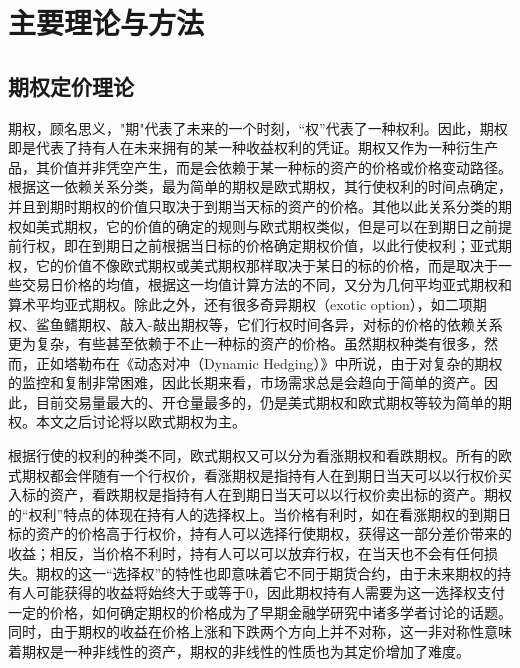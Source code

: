 
\chapter{主要理论与方法}
\label{chap:theory}

\section{期权定价理论}

期权，顾名思义，"期"代表了未来的一个时刻，“权”代表了一种权利。因此，期权即是代表了持有人在未来拥有的某一种收益权利的凭证。期权又作为一种衍生产品，其价值并非凭空产生，而是会依赖于某一种标的资产的价格或价格变动路径。根据这一依赖关系分类，最为简单的期权是欧式期权，其行使权利的时间点确定，并且到期时期权的价值只取决于到期当天标的资产的价格。其他以此关系分类的期权如美式期权，它的价值的确定的规则与欧式期权类似，但是可以在到期日之前提前行权，即在到期日之前根据当日标的价格确定期权价值，以此行使权利；亚式期权，它的价值不像欧式期权或美式期权那样取决于某日的标的价格，而是取决于一些交易日价格的均值，根据这一均值计算方法的不同，又分为几何平均亚式期权和算术平均亚式期权。除此之外，还有很多奇异期权（exotic option），如二项期权、鲨鱼鳍期权、敲入-敲出期权等，它们行权时间各异，对标的价格的依赖关系更为复杂，有些甚至依赖于不止一种标的资产的价格。虽然期权种类有很多，然而，正如塔勒布在《动态对冲（Dynamic Hedging）》中所说，由于对复杂的期权的监控和复制非常困难，因此长期来看，市场需求总是会趋向于简单的资产。因此，目前交易量最大的、开仓量最多的，仍是美式期权和欧式期权等较为简单的期权。本文之后讨论将以欧式期权为主。

根据行使的权利的种类不同，欧式期权又可以分为看涨期权和看跌期权。所有的欧式期权都会伴随有一个行权价，看涨期权是指持有人在到期日当天可以以行权价买入标的资产，看跌期权是指持有人在到期日当天可以以行权价卖出标的资产。期权的“权利”特点的体现在持有人的选择权上。当价格有利时，如在看涨期权的到期日标的资产的价格高于行权价，持有人可以选择行使期权，获得这一部分差价带来的收益；相反，当价格不利时，持有人可以可以放弃行权，在当天也不会有任何损失。期权的这一“选择权”的特性也即意味着它不同于期货合约，由于未来期权的持有人可能获得的收益将始终大于或等于0，因此期权持有人需要为这一选择权支付一定的价格，如何确定期权的价格成为了早期金融学研究中诸多学者讨论的话题。同时，由于期权的收益在价格上涨和下跌两个方向上并不对称，这一非对称性意味着期权是一种非线性的资产，期权的非线性的性质也为其定价增加了难度。

